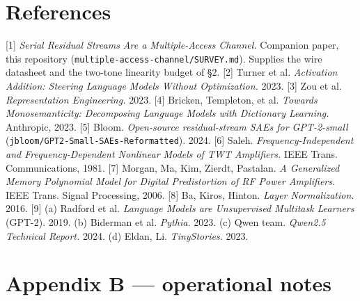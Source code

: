 \documentclass[10pt]{article}
\begin{document}
\section{References}

[1] \emph{Serial Residual Streams Are a Multiple-Access Channel.} Companion paper, this repository
(\texttt{multiple-access-channel/SURVEY.md}). Supplies the wire datasheet and the two-tone linearity budget of §2.
[2] Turner et al. \emph{Activation Addition: Steering Language Models Without Optimization.} 2023.
[3] Zou et al. \emph{Representation Engineering.} 2023.
[4] Bricken, Templeton, et al. \emph{Towards Monosemanticity: Decomposing Language Models with Dictionary Learning.} Anthropic, 2023.
[5] Bloom. \emph{Open-source residual-stream SAEs for GPT-2-small} (\texttt{jbloom/GPT2-Small-SAEs-Reformatted}). 2024.
[6] Saleh. \emph{Frequency-Independent and Frequency-Dependent Nonlinear Models of TWT Amplifiers.} IEEE Trans. Communications, 1981.
[7] Morgan, Ma, Kim, Zierdt, Pastalan. \emph{A Generalized Memory Polynomial Model for Digital Predistortion of RF Power Amplifiers.} IEEE Trans. Signal Processing, 2006.
[8] Ba, Kiros, Hinton. \emph{Layer Normalization.} 2016.
[9] (a) Radford et al. \emph{Language Models are Unsupervised Multitask Learners} (GPT-2). 2019. (b) Biderman et al. \emph{Pythia.} 2023. (c) Qwen team. \emph{Qwen2.5 Technical Report.} 2024. (d) Eldan, Li. \emph{TinyStories.} 2023.

\section{Appendix B --- operational notes}
\end{document}
